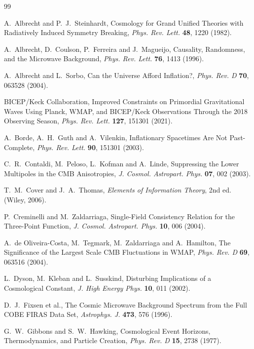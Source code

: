 \documentclass[11pt]{article}
\theoremstyle{definition}
\theoremstyle{remark}
\begin{document}
\begin{thebibliography}{99}\small

 A.~Albrecht and P.~J.~Steinhardt, Cosmology for Grand Unified Theories with Radiatively Induced Symmetry Breaking, \emph{Phys. Rev. Lett.} \textbf{48}, 1220 (1982).

 A.~Albrecht, D.~Coulson, P.~Ferreira and J.~Magueijo, Causality, Randomness, and the Microwave Background, \emph{Phys. Rev. Lett.} \textbf{76}, 1413 (1996).

 A.~Albrecht and L.~Sorbo, Can the Universe Afford Inflation?, \emph{Phys. Rev. D} \textbf{70}, 063528 (2004).

 BICEP/Keck Collaboration, Improved Constraints on Primordial Gravitational Waves Using Planck, WMAP, and BICEP/Keck Observations Through the 2018 Observing Season, \emph{Phys. Rev. Lett.} \textbf{127}, 151301 (2021).

 A.~Borde, A.~H.~Guth and A.~Vilenkin, Inflationary Spacetimes Are Not Past-Complete, \emph{Phys. Rev. Lett.} \textbf{90}, 151301 (2003).

 C.~R.~Contaldi, M.~Peloso, L.~Kofman and A.~Linde, Suppressing the Lower Multipoles in the CMB Anisotropies, \emph{J. Cosmol. Astropart. Phys.} \textbf{07}, 002 (2003).

 T.~M.~Cover and J.~A.~Thomas, \emph{Elements of Information Theory}, 2nd ed. (Wiley, 2006).

 P.~Creminelli and M.~Zaldarriaga, Single-Field Consistency Relation for the Three-Point Function, \emph{J. Cosmol. Astropart. Phys.} \textbf{10}, 006 (2004).

 A.~de Oliveira-Costa, M.~Tegmark, M.~Zaldarriaga and A.~Hamilton, The Significance of the Largest Scale CMB Fluctuations in WMAP, \emph{Phys. Rev. D} \textbf{69}, 063516 (2004).

 L.~Dyson, M.~Kleban and L.~Susskind, Disturbing Implications of a Cosmological Constant, \emph{J. High Energy Phys.} \textbf{10}, 011 (2002).

 D.~J.~Fixsen et al., The Cosmic Microwave Background Spectrum from the Full COBE FIRAS Data Set, \emph{Astrophys. J.} \textbf{473}, 576 (1996).

 G.~W.~Gibbons and S.~W.~Hawking, Cosmological Event Horizons, Thermodynamics, and Particle Creation, \emph{Phys. Rev. D} \textbf{15}, 2738 (1977).


\end{thebibliography}
\end{document}

